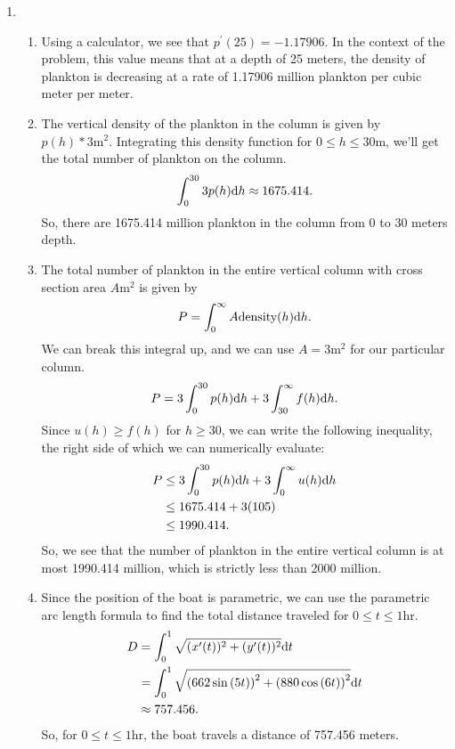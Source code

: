 \begin{enumerate}
	\item \begin{enumerate}
		\item Using a calculator, we see that $p^\prime(25) = -1.17906$.
			In the context of the problem, this value means that at a depth of 25 meters, the density of plankton is decreasing at a rate of 1.17906 million plankton per cubic meter per meter.
		\item The vertical density of the plankton in the column is given by $p(h)*3\text{m}^2$.
			Integrating this density function for $0 \leq h \leq 30\text{m}$, we'll get the total number of plankton on the column.
			\begin{equation*}
				\int_{0}^{30}{3p(h)\mathrm{d} h} \approx 1675.414.
			\end{equation*}
			So, there are 1675.414 million plankton in the column from 0 to 30 meters depth.
		\item The total number of plankton in the entire vertical column with cross section area $A\text{m}^2$ is given by
			\begin{equation*}
				P = \int_{0}^{\infty}{A\text{density}(h)\mathrm{d} h}.
			\end{equation*}
			We can break this integral up, and we can use $A=3\text{m}^2$ for our particular column.
			\begin{equation*}
				P = 3\int_{0}^{30}{p(h)\mathrm{d} h} + 3\int_{30}^{\infty}{f(h)\mathrm{d} h}.
			\end{equation*}
			Since $u(h) \geq f(h)$ for $h \geq 30$, we can write the following inequality, the right side of which we can numerically evaluate:
			\begin{align*}
				P &\leq 3\int_{0}^{30}{p(h)\mathrm{d} h} + 3\int_{0}^{\infty}{u(h)\mathrm{d} h} \\
				&\leq 1675.414 + 3(105) \\
				&\leq 1990.414.
			\end{align*}
			So, we see that the number of plankton in the entire vertical column is at most 1990.414 million, which is strictly less than 2000 million.
		\item Since the position of the boat is parametric, we can use the parametric arc length formula to find the total distance traveled for $0 \leq t \leq 1\text{hr}$.
			\begin{align*}
				D &= \int_{0}^{1}{\sqrt{(x^\prime(t))^2+(y^\prime(t))^2}\mathrm{d} t} \\
				&= \int_{0}^{1}{\sqrt{\left(662\sin{(5t)}\right)^2 + \left(880\cos{(6t)}\right)^2}\mathrm{d} t} \\
				&\approx 757.456.
			\end{align*}
			So, for $0 \leq t \leq 1\text{hr}$, the boat travels a distance of 757.456 meters.
	\end{enumerate}


\end{enumerate}
